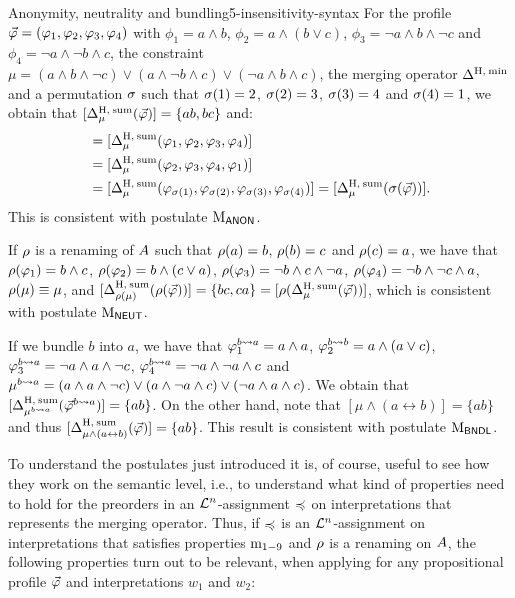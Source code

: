 \begin{xmpl}{Anonymity, neutrality and bundling}{5-insensitivity-syntax}
	For the profile 	
	$\P=(\phi_1,\phi_2,\phi_3,\phi_4)$
	with
	$\phi_1 = a\land b$,
	$\phi_2 = a\land (b\lor c)$,
	$\phi_3 = \lnot a\land b \land \lnot c$
	and
	$\phi_4 = \lnot a \land\lnot b\land c$,
	the constraint $\mu=(a\land b\land \lnot c)\lor (a\land\lnot b\land c)\lor(\lnot a\land b\land c)$,
	the merging operator $\me^{\hamming,\:\min}$
	and a permutation $\perm$ such that $\perm(1)=2$, $\perm(2)=3$, $\perm(3)=4$ and $\perm(4)=1$,
	we obtain that $[\me^{\hamming,\:\ssum}_\mu(\P)]=\{ab,bc\}$ and:
	\begin{align*}
		[\me^{\hamming,\:\ssum}_\mu(\P)] &= [\me^{\hamming,\:\ssum}_\mu(\phi_1,\phi_{2},\phi_{3},\phi_4)]\\ 
		&= [\me^{\hamming,\:\ssum}_\mu(\phi_2,\phi_{3},\phi_{4},\phi_1)]\\
		&= [\me^{\hamming,\:\ssum}_\mu(\phi_{\perm(1)},\phi_{\perm(2)},\phi_{\perm(3)},\phi_{\perm(4)})] 
		= [\me^{\hamming,\:\ssum}_\mu(\perm(\P))].	
	\end{align*}
	This is consistent with postulate $\ppm{\ANON}$.

	If $\rnm$ is a renaming of $\Atoms$ such that 
	$\rnm(a)=b$, $\rnm(b)=c$ and $\rnm(c)=a$, 
	we have that
	$\rnm(\phi_1) = b\land c$,
	$\rnm(\phi_2) = b\land (c\lor a)$,
	$\rnm(\phi_3) = \lnot b\land c \land \lnot a$,
	$\rnm(\phi_4) = \lnot b \land\lnot c\land a$,
	$\rnm(\mu)\equiv\mu$,
	and $[\me^{\hamming,\:\ssum}_{\rnm(\mu)}(\rnm(\P))]=\{bc,ca\}=[\rnm(\me^{\hamming,\:\ssum}_\mu(\P))]$,
	which is consistent with postulate $\ppm{\NEUT}$.

	If we bundle $b$ into $a$, we have that
	$\phi^{b\bndl a}_{1} = a\land a$,
	$\phi^{b\bndl b}_{2} = a\land (a\lor c)$,
	$\phi^{b\bndl a}_{3} = \lnot a\land a\land \lnot c$, 
	$\phi^{b\bndl a}_{4} = \lnot a\land \lnot a\land c$
	and
	$\mu^{b\bndl a}=(a\land a\land \lnot c)\lor (a\land\lnot a\land c)\lor(\lnot a\land a\land c)$.
	We obtain that 
	$[\me^{\hamming,\:\ssum}_{\mu^{b\bndl a}}(\P^{b\bndl a})]=\{ab\}$.	
	On the other hand, note that 
	$[\mu\land(a\leftrightarrow b)]=\{ab\}$ and thus
	$[\me^{\hamming,\:\ssum}_{\mu\land(a\leftrightarrow b)}(\P)]=\{ab\}$.
	This result is consistent with postulate $\ppm{\BNDL}$.
\end{xmpl}

To understand the postulates just introduced it is, of course, 
useful to see how they work on the semantic level,
i.e., to understand what kind of properties need to hold 
for the preorders in an $\L^n$-assignment $\as$ on interpretations
that represents the merging operator.
Thus, if $\as$ is an $\L^n$-assignment on interpretations 
that satisfies properties $\oom{1-9}$ and $\rnm$ is a renaming on $\Atoms$,
the following properties turn out to be relevant,
when applying for any propositional profile $\P$ and 
interpretations $w_1$ and $w_2$:

